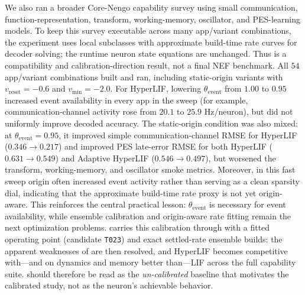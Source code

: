 \documentclass[11pt]{article}
\newcommand{\vre}{v_{\mathrm{reset}}}
\newcommand{\vmin}{v_{\min}}
\newcommand{\thetaevent}{\theta_{\mathrm{event}}}
\newcommand{\code}[1]{\texttt{#1}}
\begin{document}
We also ran a broader Core-Nengo capability survey using small communication,
function-representation, transform, working-memory, oscillator, and PES-learning
models. To keep this survey executable across many app/variant combinations, the
experiment uses local subclasses with approximate build-time rate curves for
decoder solving; the runtime neuron state equations are unchanged. Thus
 is a compatibility and calibration-direction result,
not a final NEF benchmark. All \(54\) app/variant combinations built and ran,
including static-origin variants with \(\vre=-0.6\) and \(\vmin=-2.0\).
For HyperLIF, lowering \(\thetaevent\) from \(1.00\) to \(0.95\) increased event
availability in every app in the sweep (for example, communication-channel
activity rose from \(20.1\) to \(25.9\) Hz/neuron), but did not uniformly improve
decoded accuracy. The static-origin condition was also mixed: at
\(\thetaevent=0.95\), it improved simple communication-channel RMSE for
HyperLIF (\(0.346\to 0.217\)) and improved PES late-error RMSE for both
HyperLIF (\(0.631\to 0.549\)) and Adaptive HyperLIF (\(0.546\to 0.497\)), but
worsened the transform, working-memory, and oscillator smoke metrics. Moreover,
in this fast sweep origin often increased event activity rather than serving as
a clean sparsity dial, indicating that the approximate build-time rate proxy is
not yet origin-aware. This reinforces the central practical lesson:
\(\thetaevent\) is necessary for event availability, while ensemble calibration
and origin-aware rate fitting remain the next optimization problems.
 carries this calibration through with a fitted operating
point (candidate \code{T023}) and exact settled-rate ensemble builds: the
apparent weaknesses of  are then
resolved, and HyperLIF becomes competitive with---and on dynamics and memory
better than---LIF across the full capability suite. 
should therefore be read as the \emph{un-calibrated} baseline that motivates the
calibrated study, not as the neuron's achievable behavior.
\end{document}
